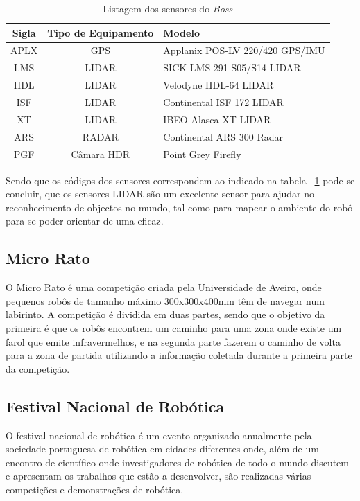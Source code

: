 \begin{table}
\begin{center}
\begin{tabular} { c c l }
	Sigla & Tipo de Equipamento & Modelo \\
	\hline
	APLX & GPS & Applanix POS-LV 220/420 GPS/IMU \\
	LMS & LIDAR & SICK LMS 291-S05/S14 LIDAR \\
	HDL & LIDAR & Velodyne HDL-64 LIDAR \\
	ISF & LIDAR & Continental ISF 172 LIDAR \\
	XT & LIDAR & IBEO Alasca XT LIDAR \\
	ARS & RADAR & Continental ARS 300 Radar \\
	PGF & Câmara HDR & Point Grey Firefly \\
	\hline
\end{tabular}
	\caption{Listagem dos sensores do \emph{Boss}}
	\label{boss_sensor}
\end{center}
\end{table}

Sendo que os códigos dos sensores correspondem ao indicado na tabela ~\ref{boss_sensor}
pode-se concluir, que os sensores LIDAR são um excelente sensor para ajudar no reconhecimento
de objectos no mundo, tal como para mapear o ambiente do robô para se poder orientar de uma eficaz.


\subsection{Micro Rato}

O  Micro Rato é uma competição criada pela Universidade de Aveiro, onde pequenos robôs de tamanho máximo 300x300x400mm têm de navegar num labirinto. A competição é dividida em duas partes, sendo que o objetivo da primeira é que os robôs encontrem um caminho para uma zona onde existe um farol que emite infravermelhos, e na segunda parte fazerem o caminho de volta para a zona de partida utilizando a informação coletada durante a primeira parte da competição.


\subsection{Festival Nacional de Robótica}

O festival nacional de robótica é um evento organizado anualmente pela sociedade
portuguesa de robótica em cidades diferentes onde, além de um encontro de científico
onde investigadores de robótica de todo o mundo discutem e apresentam os trabalhos
que estão a desenvolver, são realizadas várias competições e demonstrações de robótica.

